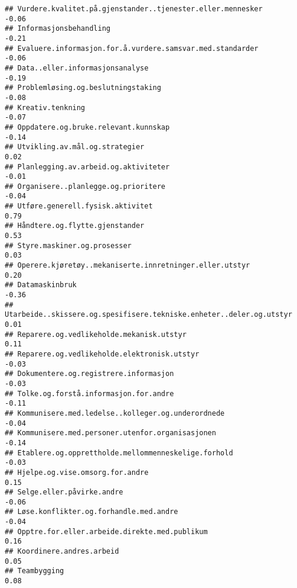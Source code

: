 \documentclass[
]{article}
\begin{document}
\begin{verbatim}
## Vurdere.kvalitet.på.gjenstander..tjenester.eller.mennesker                       -0.06
## Informasjonsbehandling                                                           -0.21
## Evaluere.informasjon.for.å.vurdere.samsvar.med.standarder                        -0.06
## Data..eller.informasjonsanalyse                                                  -0.19
## Problemløsing.og.beslutningstaking                                               -0.08
## Kreativ.tenkning                                                                 -0.07
## Oppdatere.og.bruke.relevant.kunnskap                                             -0.14
## Utvikling.av.mål.og.strategier                                                    0.02
## Planlegging.av.arbeid.og.aktiviteter                                             -0.01
## Organisere..planlegge.og.prioritere                                              -0.04
## Utføre.generell.fysisk.aktivitet                                                  0.79
## Håndtere.og.flytte.gjenstander                                                    0.53
## Styre.maskiner.og.prosesser                                                       0.03
## Operere.kjøretøy..mekaniserte.innretninger.eller.utstyr                           0.20
## Datamaskinbruk                                                                   -0.36
## Utarbeide..skissere.og.spesifisere.tekniske.enheter..deler.og.utstyr              0.01
## Reparere.og.vedlikeholde.mekanisk.utstyr                                          0.11
## Reparere.og.vedlikeholde.elektronisk.utstyr                                      -0.03
## Dokumentere.og.registrere.informasjon                                            -0.03
## Tolke.og.forstå.informasjon.for.andre                                            -0.11
## Kommunisere.med.ledelse..kolleger.og.underordnede                                -0.04
## Kommunisere.med.personer.utenfor.organisasjonen                                  -0.14
## Etablere.og.opprettholde.mellommenneskelige.forhold                              -0.03
## Hjelpe.og.vise.omsorg.for.andre                                                   0.15
## Selge.eller.påvirke.andre                                                        -0.06
## Løse.konflikter.og.forhandle.med.andre                                           -0.04
## Opptre.for.eller.arbeide.direkte.med.publikum                                     0.16
## Koordinere.andres.arbeid                                                          0.05
## Teambygging                                                                       0.08

\end{verbatim}
\end{document}
